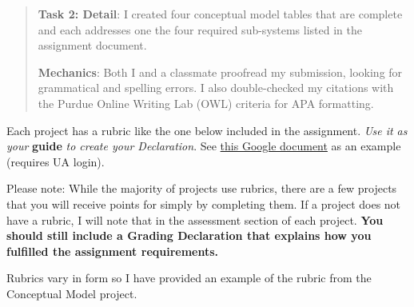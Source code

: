 \documentclass[]{article}
\begin{document}
\begin{quote}
\textbf{Task 2: Detail}: I created four conceptual model tables that are
complete and each addresses one the four required sub-systems listed in
the assignment document.

\textbf{Mechanics}: Both I and a classmate proofread my submission,
looking for grammatical and spelling errors. I also double-checked my
citations with the Purdue Online Writing Lab (OWL) criteria for APA
formatting.
\end{quote}

Each project has a rubric like the one below included in the assignment.
\emph{Use it as your} \textbf{guide} \emph{to create your Declaration}.
See
\href{https://docs.google.com/document/d/1Uu7PWCWwSLsR_3q23I7xstV_OUgMAkdvVRZJ4nw61HM/edit?usp=sharing}{this
Google document} as an example (requires UA login).

Please note: While the majority of projects use rubrics, there are a few
projects that you will receive points for simply by completing them. If
a project does not have a rubric, I will note that in the assessment
section of each project. \textbf{You should still include a Grading
Declaration that explains how you fulfilled the assignment
requirements.}

Rubrics vary in form so I have provided an example of the rubric from
the Conceptual Model project.
\end{document}
